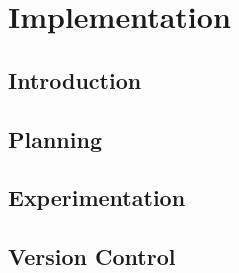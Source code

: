 \chapter{Implementation}
\section{Introduction}

\section{Planning}

\section{Experimentation}

\section{Version Control}



